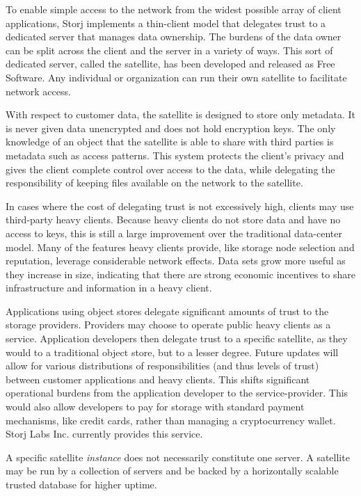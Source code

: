 \documentclass[a4paper,10pt]{article} \usepackage[utf8]{inputenc}
\begin{document}
To enable simple access to the network from the widest possible array of client
applications, Storj implements a thin-client model that delegates trust to a
dedicated server that manages data ownership. The burdens of the
data owner can be split across the client and the server in a variety of ways.
This sort of dedicated server, called the satellite, has been developed and
released as Free Software. Any individual or organization can run their own
satellite to facilitate network access.

With respect to customer data, the satellite is designed to store only
metadata. It is never given data unencrypted and does not hold encryption keys.
The only knowledge of an object that the satellite is able to share with
third parties is metadata such as access patterns. This system protects the
client's privacy and gives the client complete control over access to the data,
while delegating the responsibility of keeping files available on the network
to the satellite.

In cases where the cost of delegating trust is not excessively high,
clients may use third-party heavy clients. Because heavy clients do not store
data and have no access to keys, this is still a large improvement over the
traditional data-center model. Many of the features heavy clients provide, like
storage node selection and reputation, leverage considerable network effects. 
Data
sets grow more useful as they increase in size, indicating that there are
strong economic incentives to share infrastructure and information in a heavy
client.

Applications using object stores delegate significant amounts of trust to the
storage providers. Providers may choose to operate public heavy clients as a
service.
Application developers then delegate trust to a specific satellite, as they
would to a traditional object store, but to a lesser degree. Future updates
will allow for various distributions of responsibilities (and thus levels of
trust) between customer applications and heavy clients. This shifts significant
operational burdens from the application developer to the service-provider.
This would also allow developers to pay for storage with standard payment
mechanisms, like credit cards, rather than managing a cryptocurrency wallet.
Storj Labs Inc. currently provides this service.

A specific satellite {\em instance} does not necessarily constitute one
server. A satellite may be run by a collection of servers and be backed by
a horizontally scalable trusted database for higher uptime.
\end{document}
